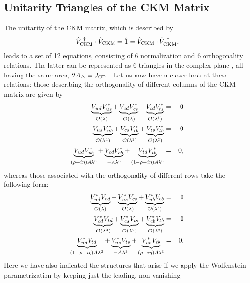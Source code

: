 \documentclass[12pt]{article}
\begin{document}
%
%
%
\subsection{Unitarity Triangles of the CKM Matrix}\label{ssec:UT}
%
%
%
The unitarity of the CKM matrix, which is described by
\begin{equation}
\hat V_{\mbox{{\scriptsize CKM}}}^{\,\,\dagger}\cdot\hat 
V_{\mbox{{\scriptsize CKM}}}=
\hat 1=\hat V_{\mbox{{\scriptsize CKM}}}\cdot\hat V_{\mbox{{\scriptsize 
CKM}}}^{\,\,\dagger},
\end{equation}
leads to a set of 12 equations, consisting of 6 normalization 
and 6 orthogonality relations. The latter can be represented as 6 
triangles in the complex plane \cite{AKL}, all having the same area, 
$2 A_{\Delta}=J_{\rm CP}$ \cite{JS}. Let us now have a closer look at 
these relations: those describing the orthogonality of different columns 
of the CKM matrix are given by
\begin{eqnarray}
\underbrace{V_{ud}V_{us}^\ast}_{{\cal O}(\lambda)}+
\underbrace{V_{cd}V_{cs}^\ast}_{{\cal O}(\lambda)}+
\underbrace{V_{td}V_{ts}^\ast}_{{\cal O}(\lambda^5)} & = &
0\\
\underbrace{V_{us}V_{ub}^\ast}_{{\cal O}(\lambda^4)}+
\underbrace{V_{cs}V_{cb}^\ast}_{{\cal O}(\lambda^2)}+
\underbrace{V_{ts}V_{tb}^\ast}_{{\cal O}(\lambda^2)} & = &
0\\
\underbrace{V_{ud}V_{ub}^\ast}_{(\rho+i\eta)A\lambda^3}+
\underbrace{V_{cd}V_{cb}^\ast}_{-A\lambda^3}+
\underbrace{V_{td}V_{tb}^\ast}_{(1-\rho-i\eta)A\lambda^3} & = &
0,\label{UT1}
\end{eqnarray}
whereas those associated with the orthogonality of different rows 
take the following form:
\begin{eqnarray}
\underbrace{V_{ud}^\ast V_{cd}}_{{\cal O}(\lambda)}+
\underbrace{V_{us}^\ast V_{cs}}_{{\cal O}(\lambda)}+
\underbrace{V_{ub}^\ast V_{cb}}_{{\cal O}(\lambda^5)} & = &
0\\
\underbrace{V_{cd}^\ast V_{td}}_{{\cal O}(\lambda^4)}+
\underbrace{V_{cs}^\ast V_{ts}}_{{\cal O}(\lambda^2)}+
\underbrace{V_{cb}^\ast V_{tb}}_{{\cal O}(\lambda^2)} & = & 0\\
\underbrace{V_{ud}^\ast V_{td}}_{(1-\rho-i\eta)A\lambda^3}+
\underbrace{V_{us}^\ast V_{ts}}_{-A\lambda^3}+
\underbrace{V_{ub}^\ast V_{tb}}_{(\rho+i\eta)A\lambda^3}
& = & 0.\label{UT2}
\end{eqnarray}
Here we have also indicated the structures that arise if we apply the 
Wolfenstein parametrization by keeping just the leading, non-vanishing 
\end{document}
